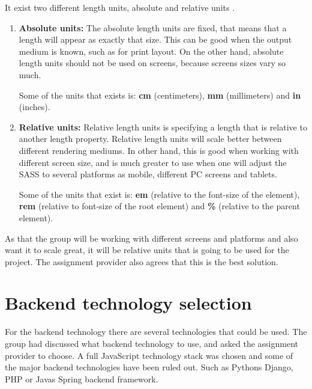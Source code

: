 It exist two different length units, absolute and relative units \cite{Units_1}.
\begin{enumerate}
  \item \textbf{Absolute units:} The absolute length units are fixed, that means that a length will appear as exactly that size. This can be good when the output medium is known, such as for print layout. On the other hand, absolute length units should not be used on screens, because screens sizes vary so much. 
  
  Some of the units that exists is: \textbf{cm} (centimeters), \textbf{mm} (millimeters) and \textbf{in} (inches).
  \item \textbf{Relative units:} Relative length units is specifying a length that is relative to another length property. Relative length units will scale better between different rendering mediums. In other hand, this is good when working with different screen size, and is much greater to use when one will adjust the SASS to several platforms as mobile, different PC screens and tablets. 
  
  Some of the units that exist is: \textbf{em} (relative to the font-size of the element), \textbf{rem} (relative to font-size of the root element) and \textbf{\%} (relative to the parent element).
\end{enumerate}

As that the group will be working with different screens and platforms and also want it to scale great, it will be relative units that is going to be used for the project. The assignment provider also agrees that this is the best solution.


\section{Backend technology selection}
For the backend technology there are several technologies that could be used. The group had discussed what backend technology to use, and asked the assignment provider to choose. A full JavaScript technology stack was chosen and some of the major backend technologies have been ruled out. Such as Pythons Django, PHP or Javas Spring backend framework. 

